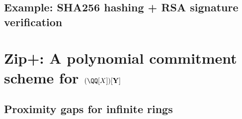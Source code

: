 \documentclass[11pt,letterpaper,usenames,dvipsnames]{article}
\begin{document}
        
    
       


\subsection{Example: SHA256 hashing + RSA signature verification}

\section{Zip+: A polynomial commitment scheme for $(\QQ[X])[\vec Y]$}

	
\subsection{Proximity gaps for infinite rings}
\label{sec:proximity-gap}



\end{document}
